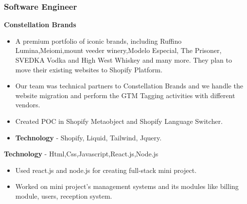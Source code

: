 \documentclass{resume}
\begin{document}
\begin{adjustwidth}{0.75cm}{0pt} %
\subsubsection*{\textbf{Software Engineer}}

  \item \textbf{ Constellation Brands } 
  \begin{itemize}
   \item A premium portfolio of iconic brands, including Ruffino Lumina,Meiomi,mount veeder winery,Modelo Especial, The Prisoner, SVEDKA Vodka and High West Whiskey and many more. They plan to move their existing websites to Shopify Platform.
   \item Our team was technical partners to Constellation Brands and we handle the website migration and perform the GTM Tagging activities with different vendors.
   \item Created POC in Shopify Metaobject and Shopify Language Switcher.\\
   \item \textbf{ Technology }- Shopify, Liquid, Tailwind, Jquery.
 \end{itemize}
 


\item \textbf{ Technology }- Html,Css,Javascript,React.js,Node.js
\item  
\begin{itemize}
  \item Used react.js and node.js for creating full-stack mini project.
  \item Worked on mini project's management systems and its modules like billing module, users, reception system.
\end{itemize}
 
 
\end{adjustwidth}

 

 
\end{document}
